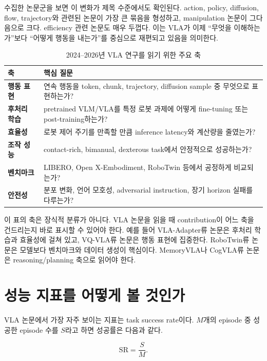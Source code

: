 수집한 논문군을 보면 이 변화가 제목 수준에서도 확인된다. action, policy, diffusion, flow, trajectory와 관련된 논문이 가장 큰 묶음을 형성하고, manipulation 논문이 그다음으로 크다. efficiency 관련 논문도 매우 두껍다. 이는 VLA가 이제 ``무엇을 이해하는가''보다 ``어떻게 행동을 내는가''를 중심으로 재편되고 있음을 의미한다.

\begin{table}[t]
  \centering
  \caption{2024--2026년 VLA 연구를 읽기 위한 주요 축}
  \label{tab:vla_axes}
  \begin{tabularx}{\textwidth}{>{\bfseries}p{33mm}X}
    \toprule
    축 & 핵심 질문 \\
    \midrule
    행동 표현 & 연속 행동을 token, chunk, trajectory, diffusion sample 중 무엇으로 표현하는가? \\
    후처리 학습 & pretrained VLM/VLA를 특정 로봇 과제에 어떻게 fine-tuning 또는 post-training하는가? \\
    효율성 & 로봇 제어 주기를 만족할 만큼 inference latency와 계산량을 줄였는가? \\
    조작 성능 & contact-rich, bimanual, dexterous task에서 안정적으로 성공하는가? \\
    벤치마크 & LIBERO, Open X-Embodiment, RoboTwin 등에서 공정하게 비교되는가? \\
    안전성 & 분포 변화, 언어 모호성, adversarial instruction, 장기 horizon 실패를 다루는가? \\
    \bottomrule
  \end{tabularx}
\end{table}

이 표의 축은 장식적 분류가 아니다. VLA 논문을 읽을 때 contribution이 어느 축을 건드리는지 바로 표시할 수 있어야 한다. 예를 들어 VLA-Adapter류 논문은 후처리 학습과 효율성에 걸쳐 있고, VQ-VLA류 논문은 행동 표현에 집중한다. RoboTwin류 논문은 모델보다 벤치마크와 데이터 생성이 핵심이다. MemoryVLA나 CogVLA류 논문은 reasoning/planning 축으로 읽어야 한다.

\section{성능 지표를 어떻게 볼 것인가}

VLA 논문에서 가장 자주 보이는 지표는 task success rate이다. $M$개의 episode 중 성공한 episode 수를 $S$라고 하면 성공률은 다음과 같다.

\begin{equation}
  \mathrm{SR} = \frac{S}{M}.
  \label{eq:success_rate}
\end{equation}

